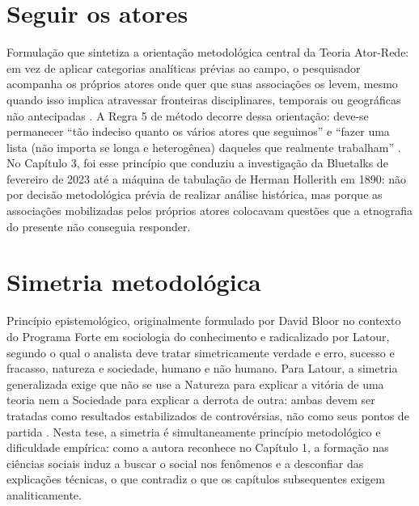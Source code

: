 \begin{description}
\bigskip

\section*{Seguir os atores}

Formulação que sintetiza a orientação metodológica central da Teoria Ator-Rede: em vez de aplicar categorias analíticas prévias ao campo, o pesquisador acompanha os próprios atores onde quer que suas associações os levem, mesmo quando isso implica atravessar fronteiras disciplinares, temporais ou geográficas não antecipadas \parencite[p.~21]{Latour2011CienciaEmAcao}. A Regra 5 de método decorre dessa orientação: deve-se permanecer ``tão indeciso quanto os vários atores que seguimos'' e ``fazer uma lista (não importa se longa e heterogênea) daqueles que realmente trabalham'' \parencite[p.~421]{Latour2011CienciaEmAcao}. No Capítulo 3, foi esse princípio que conduziu a investigação da Bluetalks de fevereiro de 2023 até a máquina de tabulação de Herman Hollerith em 1890: não por decisão metodológica prévia de realizar análise histórica, mas porque as associações mobilizadas pelos próprios atores colocavam questões que a etnografia do presente não conseguia responder.

\bigskip

\section*{Simetria metodológica}

Princípio epistemológico, originalmente formulado por David Bloor no contexto do Programa Forte em sociologia do conhecimento e radicalizado por Latour, segundo o qual o analista deve tratar simetricamente verdade e erro, sucesso e fracasso, natureza e sociedade, humano e não humano. Para Latour, a simetria generalizada exige que não se use a Natureza para explicar a vitória de uma teoria nem a Sociedade para explicar a derrota de outra: ambas devem ser tratadas como resultados estabilizados de controvérsias, não como seus pontos de partida \parencite[cap.~4]{Latour2011CienciaEmAcao}. Nesta tese, a simetria é simultaneamente princípio metodológico e dificuldade empírica: como a autora reconhece no Capítulo 1, a formação nas ciências sociais induz a buscar o social nos fenômenos e a desconfiar das explicações técnicas, o que contradiz o que os capítulos subsequentes exigem analiticamente.


\end{description}
